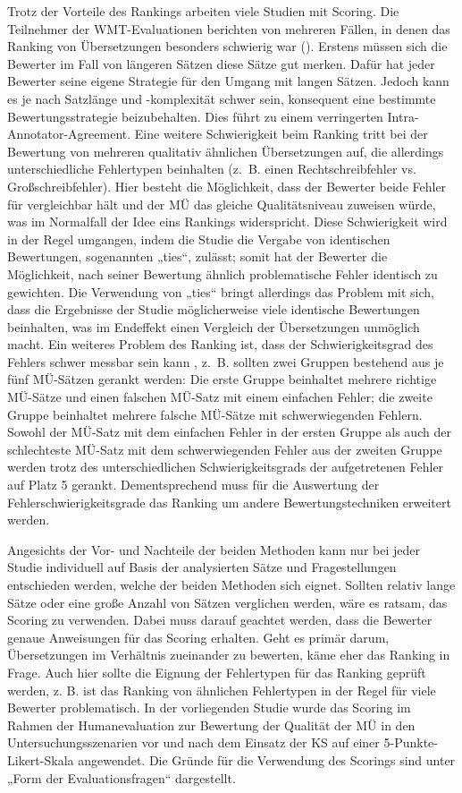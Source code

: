 Trotz der Vorteile des Rankings arbeiten viele Studien mit Scoring. Die Teilnehmer der WMT-Evaluationen berichten von mehreren Fällen, in denen das Ranking von Übersetzungen besonders schwierig war (\citealt{DenkowskiLavie2010}). Erstens müssen sich die Bewerter im Fall von längeren Sätzen diese Sätze gut merken. Dafür hat jeder Bewerter seine eigene Strategie für den Umgang mit langen Sätzen. Jedoch kann es je nach Satzlänge und -komplexität schwer sein, konsequent eine bestimmte Bewertungsstrategie beizubehalten. Dies führt zu einem verringerten Intra-Annotator-Agreement. Eine weitere Schwierigkeit beim Ranking tritt bei der Bewertung von mehreren qualitativ ähnlichen Übersetzungen auf, die allerdings unterschiedliche Fehlertypen beinhalten (z.~B. einen Rechtschreibfehler vs. Großschreibfehler). Hier besteht die Möglichkeit, dass der Bewerter beide Fehler für vergleichbar hält und der MÜ das gleiche Qualitätsniveau zuweisen würde, was im Normalfall der Idee eins Rankings widerspricht. Diese Schwierigkeit wird in der Regel umgangen, indem die Studie die Vergabe von identischen Bewertungen, sogenannten „ties“, zulässt; somit hat der Bewerter die Möglichkeit, nach seiner Bewertung ähnlich problematische Fehler identisch zu gewichten. Die Verwendung von „ties“ bringt allerdings das Problem mit sich, dass die Ergebnisse der Studie möglicherweise viele identische Bewertungen beinhalten, was im Endeffekt einen Vergleich der Übersetzungen unmöglich macht. Ein weiteres Problem des Ranking ist, dass der Schwierigkeitsgrad des Fehlers schwer messbar sein kann \citep{CostaEtAl2015}, z.~B. sollten zwei Gruppen bestehend aus je fünf MÜ-Sätzen gerankt werden: Die erste Gruppe beinhaltet mehrere richtige MÜ-Sätze und einen falschen MÜ-Satz mit einem einfachen Fehler; die zweite Gruppe beinhaltet mehrere falsche MÜ-Sätze mit schwerwiegenden Fehlern. Sowohl der MÜ-Satz mit dem einfachen Fehler in der ersten Gruppe als auch der schlechteste MÜ-Satz mit dem schwerwiegenden Fehler aus der zweiten Gruppe werden trotz des unterschiedlichen Schwierigkeitsgrads der aufgetretenen Fehler auf Platz 5 gerankt. Dementsprechend muss für die Auswertung der Fehlerschwierigkeitsgrade das Ranking um andere Bewertungstechniken erweitert werden.

Angesichts der Vor- und Nachteile der beiden Methoden kann nur bei jeder Studie individuell auf Basis der analysierten Sätze und Fragestellungen entschieden werden, welche der beiden Methoden sich eignet. Sollten relativ lange Sätze oder eine große Anzahl von Sätzen verglichen werden, wäre es ratsam, das Scoring zu verwenden. Dabei muss darauf geachtet werden, dass die Bewerter genaue Anweisungen für das Scoring erhalten. Geht es primär darum, Übersetzungen im Verhältnis zueinander zu bewerten, käme eher das Ranking in Frage. Auch hier sollte die Eignung der Fehlertypen für das Ranking geprüft werden, z. B. ist das Ranking von ähnlichen Fehlertypen in der Regel für viele Bewerter problematisch. In der vorliegenden Studie wurde das Scoring im Rahmen der Humanevaluation zur Bewertung der Qualität der MÜ in den Untersuchungsszenarien vor und nach dem Einsatz der KS auf einer 5-Punkte-Likert-Skala angewendet. Die Gründe für die Verwendung des Scorings sind unter  „Form der Evaluationsfragen“ dargestellt.

